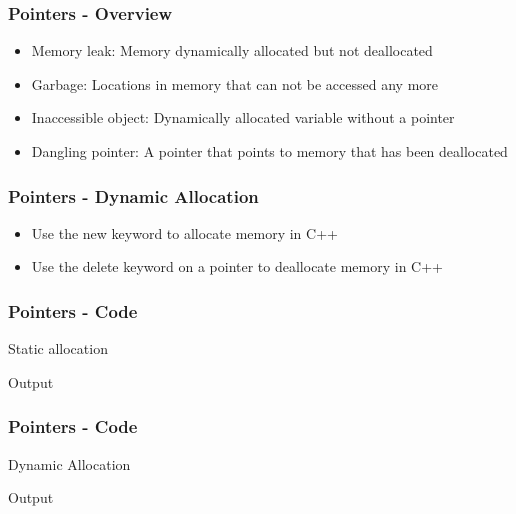 \documentclass[c, aspectratio=169]{beamer}
\begin{document}
\begin{frame}\frametitle{Pointers - Overview}
\begin{itemize}
\item Memory leak: Memory dynamically allocated but not deallocated
\item Garbage: Locations in memory that can not be accessed any more
\item Inaccessible object: Dynamically allocated variable without a pointer
\item Dangling pointer: A pointer that points to memory that has been deallocated
\end{itemize}
\end{frame}

\begin{frame}\frametitle{Pointers - Dynamic Allocation}
\begin{itemize}
\item Use the new keyword to allocate memory in C++
\item Use the delete keyword on a pointer to deallocate memory in C++
\end{itemize}
\end{frame}

\begin{frame}\frametitle{Pointers - Code}
Static allocation


Output

\end{frame}

\begin{frame}\frametitle{Pointers - Code}
Dynamic Allocation


Output

\end{frame}
\end{document}
